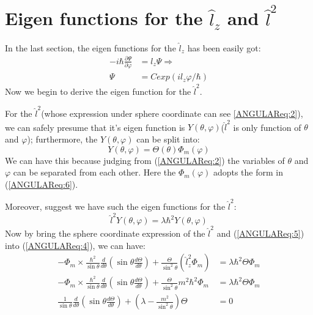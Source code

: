 \section{Eigen functions for the $\hat{l}_{z}$ and $\hat{l}^{2}$}
%
%
%
%

In the last section, the eigen functions for the $\hat{l}_{z}$ has
been easily got:
\begin{align}\label{}
-i\hbar\frac{\partial \Psi}{\partial\varphi} &= l_{z}\Psi
\Rightarrow \nonumber
\\
\Psi &= C exp(il_{z}\varphi/\hbar)
\end{align}
Now we begin to derive the eigen function for the $\hat{l}^{2}$.

For the $\hat{l}^{2}$(whose expression under sphere coordinate can
see \ref{ANGULAReq:2}), we can safely presume that it's eigen
function is $Y(\theta, \varphi)$($\hat{l}^{2}$ is only function of
$\theta$ and  $\varphi$); furthermore, the $Y(\theta, \varphi)$ can
be split into:
\begin{equation}\label{ANGULAReq:5}
Y(\theta, \varphi) = \Theta (\theta)\Phi_{m}(\varphi)
\end{equation}
We can have this because judging from (\ref{ANGULAReq:2}) the
variables of $\theta$ and  $\varphi$ can be separated from each
other. Here the $\Phi_{m}(\varphi)$ adopts the form in
(\ref{ANGULAReq:6}).

Moreover, suggest we have such the eigen functions for the
$\hat{l}^{2}$:
\begin{equation}\label{ANGULAReq:4}
\hat{l}^{2}Y(\theta, \varphi) = \lambda \hbar^{2}Y(\theta, \varphi)
\end{equation}
Now by bring the sphere coordinate expression of the $\hat{l}^{2}$
and (\ref{ANGULAReq:5}) into (\ref{ANGULAReq:4}), we can have:
\begin{align}\label{}
-\Phi_{m}\times\frac{\hbar^{2}}{\sin\theta}\frac{d}{d
\theta}\left(\sin\theta\frac{d\Theta}{d \theta}\right) +
\frac{\Theta}{\sin^{2}\theta}(\hat{l}^{2}_{z}\Phi_{m}) &=
\lambda \hbar^{2}\Theta \Phi_{m} \nonumber \\
-\Phi_{m}\times\frac{\hbar^{2}}{\sin\theta}\frac{d}{d
\theta}\left(\sin\theta\frac{d\Theta}{d \theta}\right) +
\frac{\Theta}{\sin^{2}\theta}m^{2}\hbar^{2}\Phi_{m} &=
\lambda \hbar^{2}\Theta \Phi_{m} \nonumber \\
\frac{1}{\sin\theta}\frac{d}{d
\theta}\left(\sin\theta\frac{d\Theta}{d \theta}\right) +
\left(\lambda - \frac{m^{2}}{\sin^{2}\theta}\right)\Theta &= 0
\end{align}


